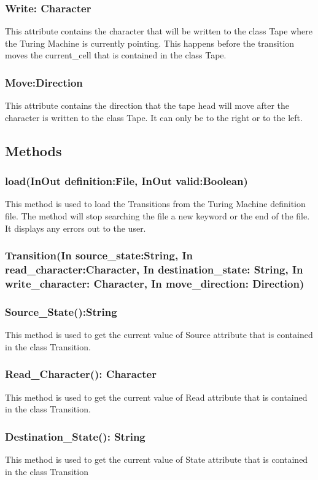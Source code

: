 \documentclass{report}
\begin{document}
    \subsubsection{Write: Character}
    This attribute contains the character that will be written to the class Tape where the Turing Machine is currently pointing. This happens before the transition moves the current\_cell that is contained in the class Tape.
    \subsubsection{Move:Direction}
    This attribute contains the direction that the tape head will move after the character is written to the class Tape. It can only be to the right or to the left.
    
    \subsection{Methods} 
      \subsubsection{load(InOut definition:File, InOut valid:Boolean)}
      This method is used to load the Transitions from the Turing Machine definition file. The method will stop searching the file a new keyword or the end of the file. It displays any errors out to the user.
        \subsubsection{Transition(In source\_state:String, In read\_character:Character, In destination\_state: String, In write\_character: Character, In move\_direction: Direction)}
        
    
    \subsubsection{Source\_State():String}
    This method is used to get the current value of Source attribute that is contained in the class Transition.
    \subsubsection{Read\_Character(): Character}
    This method is used to get the current value of Read attribute that is contained in the class Transition.
    \subsubsection{Destination\_State(): String}
    This method is used to get the current value of State attribute that is contained in the class Transition
\end{document}
